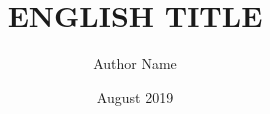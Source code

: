 \documentclass[chaparabic,is,phd,10pt,single]{metu}
\author{Author Name} %
\title{ENGLISH TITLE} %
\date{August 2019} %
\begin{document}
\begin{preliminaries}


\end{preliminaries}
%   
% 
%

\setlength{\parindent}{0em}
\setlength{\parskip}{10pt}












%
%

%

% 

\appendix



%
\end{document}
